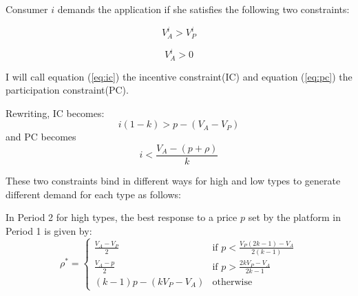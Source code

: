 \documentclass[12pt]{article}
\begin{document}
Consumer $i$ demands the application if she satisfies the following two constraints:

\begin{equation}
\label{eq:ic}
V_A^i>V_P^i
\end{equation}

\begin{equation}
\label{eq:pc}
V_A^i>0
\end{equation}

I will call equation (\ref{eq:ic}) the incentive constraint(IC) and
equation (\ref{eq:pc}) the
participation constraint(PC). 

Rewriting, IC becomes: $$i(1-k)>p-(V_A-V_P)$$ and PC becomes $$i<\frac{V_A-(p+\rho)}{k}$$

These two constraints bind in different ways for high and low
types to generate different demand for each type as follows:

\begin{proposition}
\label{prop1}
In Period 2 for high types, the best response to a price $p$ set by the platform in
Period 1 is given by:\[ \rho^* = 
\begin{cases}

  \frac{V_A-V_P}{2} & \text{if $p < \frac{V_P(2k-1)-V_A}{2(k-1)}$} \\
  \frac{V_A-p}{2} & \text{if $p > \frac{2kV_P-V_A}{2k-1}$} \\
  (k-1)p-(kV_P-V_A) & \text{otherwise}


\end{cases} \]
\end{proposition}
\end{document}
